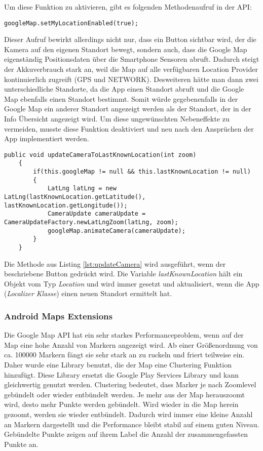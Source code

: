 Um diese Funktion zu aktivieren, gibt es folgenden Methodenaufruf in der API: 

\begin{lstlisting}[caption={},label=lst:setMyLocationEnabled]
	googleMap.setMyLocationEnabled(true);
\end{lstlisting}

Dieser Aufruf bewirkt allerdings nicht nur, dass ein Button sichtbar wird, der die Kamera auf den eigenen Standort bewegt, sondern auch, dass die Google Map eigenständig Positionsdaten über die Smartphone Sensoren abruft. Dadurch steigt der Akkuverbrauch stark an, weil die Map auf alle verfügbaren Location Provider kontinuierlich zugreift (GPS und NETWORK). Desweiteren hätte man dann zwei unterschiedliche Standorte, da die App einen Standort abruft und die Google Map ebenfalls einen Standort bestimmt. Somit würde gegebenenfalls in der Google Map ein anderer Standort angezeigt werden als der Standort, der in der Info Übersicht angezeigt wird. Um diese ungewünschten Nebeneffekte zu vermeiden, musste diese Funktion deaktiviert und neu nach den Ansprüchen der App implementiert werden.

\begin{lstlisting}[caption={"Kamera auf letzte bekannte Position setzen"},label=lst:updateCamera]
	public void updateCameraToLastKnownLocation(int zoom)
	{
		if(this.googleMap != null && this.lastKnownLocation != null)
		{
			LatLng latLng = new LatLng(lastKnownLocation.getLatitude(), 					lastKnownLocation.getLongitude());
		    CameraUpdate cameraUpdate = CameraUpdateFactory.newLatLngZoom(latLng, zoom);
		    googleMap.animateCamera(cameraUpdate);
		}
	}
\end{lstlisting}

Die Methode aus Listing \ref{lst:updateCamera} wird ausgeführt, wenn der beschriebene Button gedrückt wird. Die Variable \textit{lastKnownLocation} hält ein Objekt vom Typ \textit{Location} und wird immer gesetzt und aktualisiert, wenn die App (\textit{Localizer Klasse}) einen neuen Standort ermittelt hat. 

\subsubsection{Android Maps Extensions}

Die Google Map API hat ein sehr starkes Performanceproblem, wenn auf der Map eine hohe Anzahl von Markern angezeigt wird. Ab einer Größenordnung von ca. 100000 Markern fängt sie sehr stark an zu ruckeln und friert teilweise ein. Daher wurde eine Library benutzt, die der Map eine Clustering Funktion hinzufügt. Diese Library ersetzt die Google Play Services Library und kann gleichwertig genutzt werden. Clustering bedeutet, dass Marker je nach Zoomlevel gebündelt oder wieder entbündelt werden. Je mehr aus der Map herauszoomt wird, desto mehr Punkte werden gebündelt. Wird wieder in die Map herein gezoomt, werden sie wieder entbündelt. Dadurch wird immer eine kleine Anzahl an Markern dargestellt und die Performance bleibt stabil auf einem guten Niveau. Gebündelte Punkte zeigen auf ihrem Label die Anzahl der zusammengefassten Punkte an.

